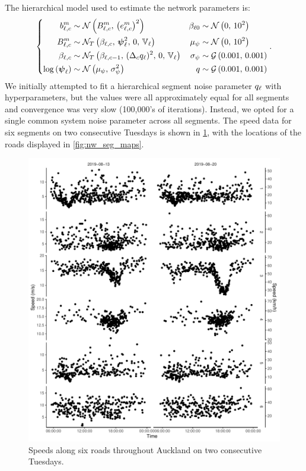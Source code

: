 The hierarchical model used to estimate the network parameters is:
\begin{equation}
\label{eq:tt_hist_hier}
\left\{
\begin{split}
b_{\ell,c}^m &\sim \mathcal{N}\left(B_{\ell,c}^m,\, \left(e_{\ell,c}^m\right)^2\right) &
\beta_{\ell0} &\sim \mathcal{N}\left(0,\, 10^2\right) \\
B_{\ell,c}^m &\sim \mathcal{N}_T\left(\beta_{\ell,c},\, \mathbf{\boldsymbol{\psi}}_{\ell}^2,\, 0,\, \mathbb{V}_\ell\right) &
\mu_\psi &\sim \mathcal{N}\left(0,\, 10^2\right) \\
\beta_{\ell,c} &\sim \mathcal{N}_T\left(\beta_{\ell,c-1},\, (\Delta_c q_{\ell})^2,\, 0,\, \mathbb{V}_\ell\right) &
\sigma_\psi &\sim \mathcal{G}\left(0.001,\, 0.001\right) \\
\log\left(\mathbf{\boldsymbol{\psi}}_{\ell}\right) &\sim \mathcal{N}\left(\mu_\psi,\, \sigma_\psi^2\right) &
q &\sim \mathcal{G}\left(0.001,\, 0.001\right)
\end{split}
\right. .
\end{equation}
We initially attempted to fit a hierarchical segment noise parameter $q_{\ell}$ with hyperparameters, but the values were all approximately equal for all segments and convergence was very slow (100,000's of iterations). Instead, we opted for a single common system noise parameter across all segments. The speed data for six segments on two consecutive Tuesdays is shown in \cref{fig:nw_model_n2_segplots}, with the locations of the roads displayed in \cref{fig:nw_seg_maps}.

\begin{knitrout}\small
{}\color{fgcolor}\begin{figure}

{\centering \includegraphics[width=.8\textwidth]{figure/nw_model_n2_segplots-1} 

}

\caption[Speeds along six roads throughout Auckland on two consecutive Tuesdays]{Speeds along six roads throughout Auckland on two consecutive Tuesdays.}\label{fig:nw_model_n2_segplots}
\end{figure}


\end{knitrout}

